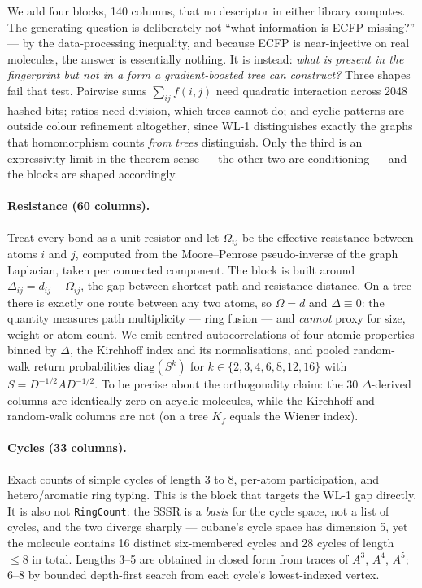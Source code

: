 We add four blocks, 140 columns, that no descriptor in either library computes. The generating
question is deliberately not ``what information is ECFP missing?'' --- by the data-processing
inequality, and because ECFP is near-injective on real molecules, the answer is essentially
nothing. It is instead: \emph{what is present in the fingerprint but not in a form a
gradient-boosted tree can construct?} Three shapes fail that test. Pairwise sums
$\sum_{ij} f(i,j)$ need quadratic interaction across 2048 hashed bits; ratios need division,
which trees cannot do; and cyclic patterns are outside colour refinement altogether, since
WL-1 distinguishes exactly the graphs that homomorphism counts \emph{from trees} distinguish.
Only the third is an expressivity limit in the theorem sense --- the other two are conditioning
--- and the blocks are shaped accordingly.

\paragraph{Resistance (60 columns).} Treat every bond as a unit resistor and let $\Omega_{ij}$
be the effective resistance between atoms $i$ and $j$, computed from the Moore--Penrose
pseudo-inverse of the graph Laplacian, taken per connected component. The block is built around
$\Delta_{ij} = d_{ij} - \Omega_{ij}$, the gap between shortest-path and resistance distance.
On a tree there is exactly one route between any two atoms, so $\Omega = d$ and $\Delta \equiv 0$:
the quantity measures path multiplicity --- ring fusion --- and \emph{cannot} proxy for size,
weight or atom count. We emit centred autocorrelations of four atomic properties binned by
$\Delta$, the Kirchhoff index and its normalisations, and pooled random-walk return
probabilities $\mathrm{diag}(S^k)$ for $k \in \{2,3,4,6,8,12,16\}$ with
$S = D^{-1/2} A D^{-1/2}$. To be precise about the orthogonality claim: the 30 $\Delta$-derived
columns are identically zero on acyclic molecules, while the Kirchhoff and random-walk columns
are not (on a tree $K_f$ equals the Wiener index).

\paragraph{Cycles (33 columns).} Exact counts of simple cycles of length 3 to 8, per-atom
participation, and hetero/aromatic ring typing. This is the block that targets the WL-1 gap
directly. It is also not \texttt{RingCount}: the SSSR is a \emph{basis} for the cycle space, not
a list of cycles, and the two diverge sharply --- cubane's cycle space has dimension 5, yet the
molecule contains 16 distinct six-membered cycles and 28 cycles of length $\leq 8$ in total.
Lengths 3--5 are obtained in closed form from traces of $A^3$, $A^4$, $A^5$; 6--8 by bounded
depth-first search from each cycle's lowest-indexed vertex.

